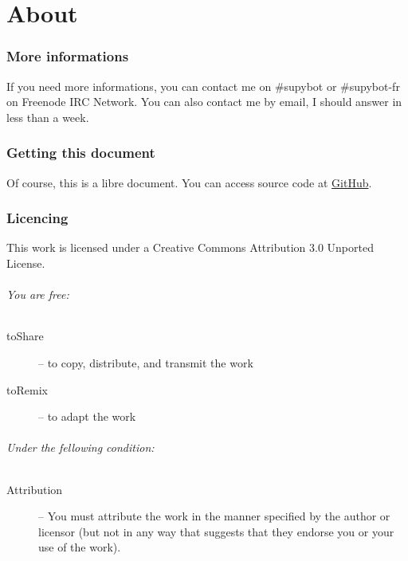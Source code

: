 \documentclass[a4paper,11pt]{article}
\begin{document}
    


    
\clearpage
\newpage
\part*{About}
  \section*{More informations}
    If you need more informations, you can contact me on \mbox{\#supybot} or
    \mbox{\#supybot-fr} on Freenode IRC Network.
    You can also contact me by email, I should answer in less than a week.
  
  \section*{Getting this document}
    Of course, this is a libre document. You can access source code at
    \href{https://github.com/ProgVal/Supybot-docs}{GitHub}.
  
  \section*{Licencing}
    This work is licensed under a Creative Commons Attribution 3.0 Unported License.
    \paragraph{You are free:}
      \begin{description}
        \item[toShare] -- to copy, distribute, and transmit the work
        \item[toRemix] -- to adapt the work
      \end{description}

    \paragraph{Under the fellowing condition:}
      \begin{description}
        \item[Attribution] -- You must attribute the work in the
manner specified by the author or licensor (but not in any way that suggests
that they endorse you or your use of the work). 
        
      \end{description}
\end{document}
